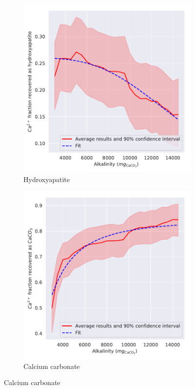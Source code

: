 \begin{refsection}[referencesCh3]
\begin{figure}[h]
\begin{subfigure}[t]{0.32\textheight}
		\includegraphics[width=\textwidth]{gfx/AppendixB/x_plotHAPYield_Alk} 
		\caption{Hydroxyapatite}
		\label{fig:estimation_Alk_HAP}
	\end{subfigure} 
	\begin{subfigure}[t]{0.32\textheight}
		\includegraphics[width=\textwidth]{gfx/AppendixB/x_plotCaCO3Yield_Alk}
		\caption{Calcium carbonate}
		\label{fig:estimation_Alk_CaCO3}
	\end{subfigure}
	

\end{figure}
\end{refsection}
